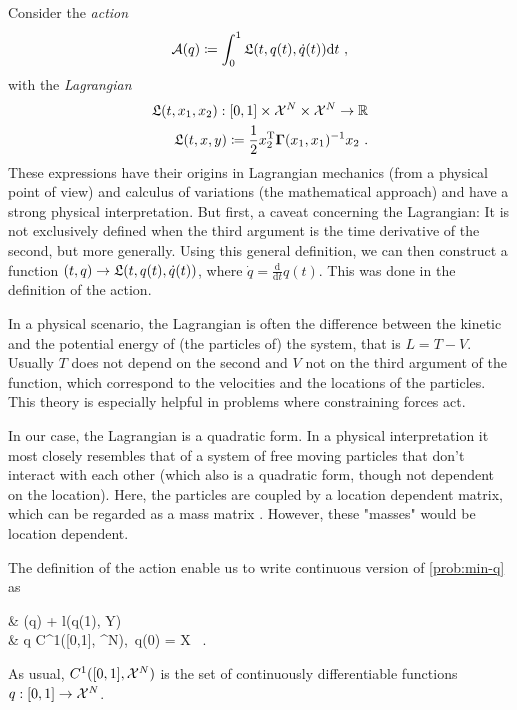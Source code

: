 Consider the \emph{action}
\begin{equation}
\label{eq:action}
	\cA(q) \coloneqq \int_{0}^{1} \fL(t, q(t), \dot{q}(t)) \mathrm{d}t \ ,
\end{equation}
with the \emph{Lagrangian}
\begin{equation}
\label{eq:lagrangian}
	\begin{split}
		\mathfrak{L}(t, x_1, x_2): [0, 1] \times \mathcal{X}^N \times \mathcal{X}^N \rightarrow \mathbb{R}\\ \mathfrak{L}(t, x, y) \coloneqq \frac{1}{2}  x_2^\mathrm{T} \mathbf{\Gamma}(x_1, x_1)^{-1} x_2 \ .
	\end{split}
\end{equation}
These expressions have their origins in Lagrangian mechanics (from a physical point of view) and calculus of variations (the mathematical approach) and have a strong physical interpretation.
But first, a caveat concerning the Lagrangian:
It is not exclusively defined when the third argument is the time derivative of the second, but more generally.
Using this general definition, we can then construct a function $(t, q) \rightarrow \mathfrak{L}(t, q(t), \dot{q}(t))$, where $\dot{q} = \frac{\mathrm{d}}{\mathrm{d}t}q(t)$.
This was done in the definition of the action.

In a physical scenario, the Lagrangian is often the difference between the kinetic and the potential energy of (the particles of) the system, that is $L = T - V$.
Usually $T$ does not depend on the second and $V$ not on the third argument of the function, which correspond to the velocities and the locations of the particles.
This theory is especially helpful in problems where constraining forces act.

In our case, the Lagrangian is a quadratic form.
In a physical interpretation it most closely resembles that of a system of free moving particles that don't interact with each other (which also is a quadratic form, though not dependent on the location).
Here, the particles are coupled by a location dependent matrix, which can be regarded as a mass matrix \cite{marsden10}.
However, these "masses" would be location dependent.

The definition of the action enable us to write continuous version of \cref{prob:min-q} as
\begin{problem}
\label{prob:cont-least-action}
	\begin{cases}
		 & \nu \cA(q) + l(q(1), Y)\\
		 & q \in C^1([0,1], \cX^N),\ q(0) = X \ .
	\end{cases}
\end{problem}
As usual, $C^1([0,1], \mathcal{X}^N)$ is the set of continuously differentiable functions $q: [0, 1] \rightarrow \mathcal{X}^N$.


